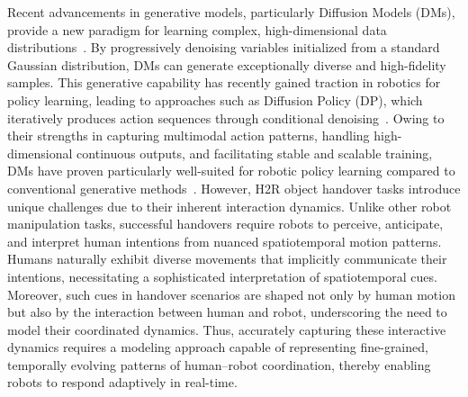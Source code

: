 \documentclass[final,5p,times,twocolumn]{elsarticle}
\begin{document}
Recent advancements in generative models, particularly Diffusion Models (DMs), provide a new paradigm for learning complex, high-dimensional data distributions~\cite{yang2023diffusion, leng2025diffusion, leng2026aigc, zhong2025diffusion}. By progressively denoising variables initialized from a standard Gaussian distribution, DMs can generate exceptionally diverse and high-fidelity samples. This generative capability has recently gained traction in robotics for policy learning, leading to approaches such as Diffusion Policy (DP), which iteratively produces action sequences through conditional denoising~\cite{chi2023diffusion, Ze2024DP3}. Owing to their strengths in capturing multimodal action patterns, handling high-dimensional continuous outputs, and facilitating stable and scalable training, DMs have proven particularly well-suited for robotic policy learning compared to conventional generative methods~\cite{chi2023diffusion}. However, H2R object handover tasks introduce unique challenges due to their inherent interaction dynamics. Unlike other robot manipulation tasks, successful handovers require robots to perceive, anticipate, and interpret human intentions from nuanced spatiotemporal motion patterns. Humans naturally exhibit diverse movements that implicitly communicate their intentions, necessitating a sophisticated interpretation of spatiotemporal cues. Moreover, such cues in handover scenarios are shaped not only by human motion but also by the interaction between human and robot, underscoring the need to model their coordinated dynamics. Thus, accurately capturing these interactive dynamics requires a modeling approach capable of representing fine-grained, temporally evolving patterns of human–robot coordination, thereby enabling robots to respond adaptively in real-time.
\end{document}
